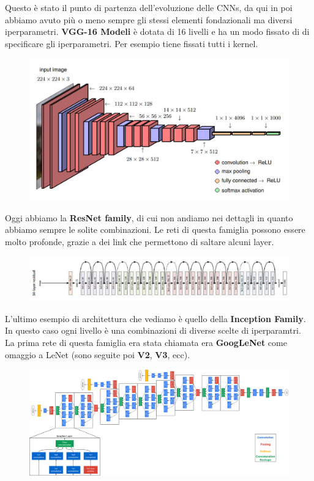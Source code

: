 Questo è stato il punto di partenza dell'evoluzione delle CNNs, da qui in poi abbiamo avuto più o meno sempre gli stessi elementi fondazionali ma diversi iperparametri.
\newline
\newline
\textbf{VGG-16 Modeli} è dotata di 16 livelli e ha un modo fissato di di specificare gli iperparametri. Per esempio tiene fissati tutti i kernel.
\begin{figure}[!h]
    \includegraphics[scale=.5]{images/cnn/vgg.png}
    \centering
\end{figure}
\newpage
Oggi abbiamo la \textbf{ResNet family}, di cui  non andiamo nei dettagli in quanto abbiamo sempre le solite combinazioni. Le reti di questa famiglia possono essere molto profonde, grazie a dei link che permettono di saltare alcuni layer. 
\begin{figure}[!h]
    \includegraphics[scale=.5]{images/cnn/resnet.png}
    \centering
\end{figure}


L'ultimo esempio di architettura che vediamo è quello della \textbf{Inception Family}. In questo caso ogni livello è una combinazioni di diverse scelte di iperparamtri. La prima rete di questa famiglia era stata chiamata era \textbf{GoogLeNet} come omaggio a LeNet (sono seguite poi \textbf{V2}, \textbf{V3}, ecc).
\begin{figure}[!h]
    \includegraphics[scale=.35]{images/cnn/inception.png}
    \centering
\end{figure}
\newpage
